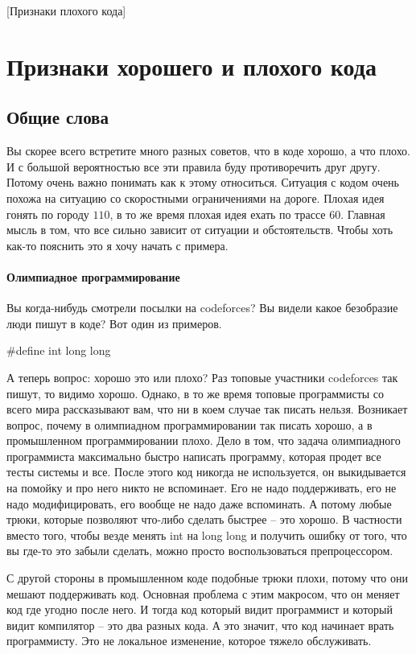 [Признаки плохого кода]


\section{Признаки хорошего и плохого кода}

\subsection{Общие слова}

Вы скорее всего встретите много разных советов, что в коде хорошо, а что плохо.
И с большой вероятностью все эти правила буду противоречить друг другу.
Потому очень важно понимать как к этому относиться.
Ситуация с кодом очень похожа на ситуацию со скоростными ограничениями на дороге.
Плохая идея гонять по городу $110$, в то же время плохая идея ехать по трассе $60$.
Главная мысль в том, что все сильно зависит от ситуации и обстоятельств.
Чтобы хоть как-то пояснить это я хочу начать с примера.

\paragraph{Олимпиадное программирование}

Вы когда-нибудь смотрели посылки на codeforces?
Вы видели какое безобразие люди пишут в коде?
Вот один из примеров.
\begin{cppcode}
#define int long long
\end{cppcode}
А теперь вопрос: хорошо это или плохо?
Раз топовые участники codeforces так пишут, то видимо хорошо.
Однако, в то же время топовые программисты со всего мира рассказывают вам, что ни в коем случае так писать нельзя.
Возникает вопрос, почему в олимпиадном программировании так писать хорошо, а в промышленном программировании плохо.
Дело в том, что задача олимпиадного программиста максимально быстро написать программу, которая продет все тесты системы и все.
После этого код никогда не используется, он выкидывается на помойку и про него никто не вспоминает.
Его не надо поддерживать, его не надо модифицировать, его вообще не надо даже вспоминать.
А потому любые трюки, которые позволяют что-либо сделать быстрее -- это хорошо.
В частности вместо того, чтобы везде менять int на long long и получить ошибку от того, что вы где-то это забыли сделать, можно просто воспользоваться препроцессором.

С другой стороны в промышленном коде подобные трюки плохи, потому что они мешают поддерживать код.
Основная проблема с этим макросом, что он меняет код где угодно после него.
И тогда код который видит программист и который видит компилятор -- это два разных кода.
А это значит, что код начинает врать программисту.
Это не локальное изменение, которое тяжело обслуживать.

